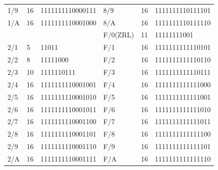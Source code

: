 \documentclass{article}
\numberwithin{figure}{section}
\numberwithin{table}{section}
\numberwithin{listing}{section}
\numberwithin{equation}{section}
\begin{document}
\begin{table}[H]
\begin{tabular}{llllll}
                1/9 & 16 & 1111111110000111 & 8/9 & 16 & 1111111110111101 \\
                1/A & 16 & 1111111110001000 & 8/A & 16 & 1111111110111110 \\
                 & & & F/0(ZRL) & 11 & 11111111001 \\
                2/1 & 5 & 11011 & F/1 & 16 & 1111111111110101 \\
                2/2 & 8 & 11111000 & F/2 & 16 & 1111111111110110 \\
                2/3 & 10 & 1111110111 & F/3 & 16 & 1111111111110111 \\
                2/4 & 16 & 1111111110001001 & F/4 & 16 & 1111111111111000 \\
                2/5 & 16 & 1111111110001010 & F/5 & 16 & 1111111111111001 \\
                2/6 & 16 & 1111111110001011 & F/6 & 16 & 1111111111111010 \\
                2/7 & 16 & 1111111110001100 & F/7 & 16 & 1111111111111011 \\
                2/8 & 16 & 1111111110001101 & F/8 & 16 & 1111111111111100 \\
                2/9 & 16 & 1111111110001110 & F/9 & 16 & 1111111111111101 \\
                2/A & 16 & 1111111110001111 & F/A & 16 & 1111111111111110 \\
            \hline
        
            \hline
            \end{tabular}
        \end{table}
\end{document}

